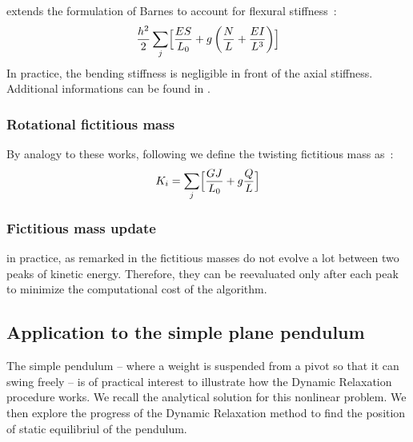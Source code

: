  extends the formulation of Barnes to account for flexural stiffness~:
\begin{equation}
	\frac{h^2}{2} \sum_j \Bigl[\frac{ES}{L_0} + g \left(\frac{N}{L} + \frac{EI}{L^3} \right) \Bigr]
\end{equation}
In practice, the bending stiffness is negligible in front of the axial stiffness. Additional informations can be found in \cite{Lewis2003,Rodriguez2011a}.

\subsubsection{Rotational fictitious mass}
By analogy to these works, following \cite{Lefevre2017} we define the twisting fictitious mass as~:
\begin{equation}
	K_i = \sum_j \Bigl[\frac{GJ}{L_0} + g \frac{Q}{L} \Bigr]
\end{equation}


\subsubsection{Fictitious mass update}
in practice, as remarked in \cite{Douthe2007} the fictitious masses do not evolve a lot between two peaks of kinetic energy. Therefore, they can be reevaluated only after each peak to minimize the computational cost of the algorithm.

\subsection{Application to the simple plane pendulum}
The simple pendulum -- where a weight is suspended from a pivot so that it can swing freely -- is of practical interest to illustrate how the Dynamic Relaxation procedure works. We recall the analytical solution for this nonlinear problem. We then explore the progress of the Dynamic Relaxation method to find the position of static equilibriul of the pendulum.

